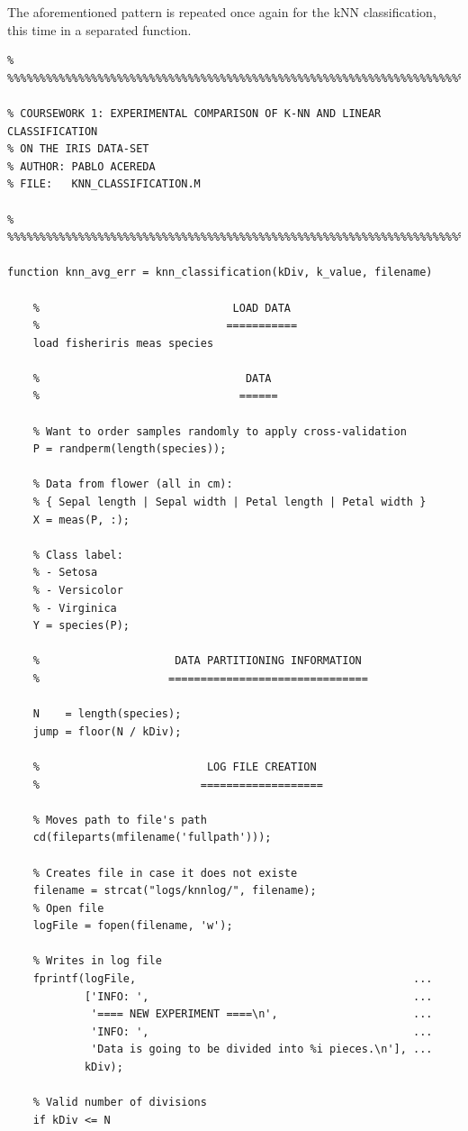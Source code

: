 \documentclass[11pt]{article}
\begin{document}
The aforementioned pattern is repeated once again for the kNN classification,
this time in a separated function.

\begin{verbatim}
% %%%%%%%%%%%%%%%%%%%%%%%%%%%%%%%%%%%%%%%%%%%%%%%%%%%%%%%%%%%%%%%%%%%%%%%%%

% COURSEWORK 1: EXPERIMENTAL COMPARISON OF K-NN AND LINEAR CLASSIFICATION
% ON THE IRIS DATA-SET
% AUTHOR: PABLO ACEREDA
% FILE:   KNN_CLASSIFICATION.M

% %%%%%%%%%%%%%%%%%%%%%%%%%%%%%%%%%%%%%%%%%%%%%%%%%%%%%%%%%%%%%%%%%%%%%%%%%

function knn_avg_err = knn_classification(kDiv, k_value, filename)

    %                              LOAD DATA
    %                             ===========
    load fisheriris meas species 

    %                                DATA 
    %                               ======

    % Want to order samples randomly to apply cross-validation
    P = randperm(length(species));

    % Data from flower (all in cm):
    % { Sepal length | Sepal width | Petal length | Petal width }
    X = meas(P, :);

    % Class label:
    % - Setosa
    % - Versicolor
    % - Virginica
    Y = species(P);

    %                     DATA PARTITIONING INFORMATION
    %                    ===============================

    N    = length(species);
    jump = floor(N / kDiv);

    %                          LOG FILE CREATION
    %                         ===================

    % Moves path to file's path
    cd(fileparts(mfilename('fullpath')));

    % Creates file in case it does not existe
    filename = strcat("logs/knnlog/", filename);
    % Open file 
    logFile = fopen(filename, 'w');

    % Writes in log file
    fprintf(logFile,                                           ...
            ['INFO: ',                                         ...
             '==== NEW EXPERIMENT ====\n',                     ...
             'INFO: ',                                         ...
             'Data is going to be divided into %i pieces.\n'], ...
            kDiv);

    % Valid number of divisions
    if kDiv <= N


\end{verbatim}
\end{document}

